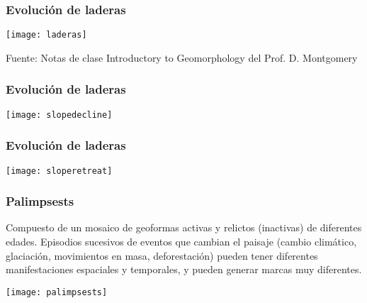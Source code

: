 \documentclass[]{beamer}
\begin{document}
\begin{frame}
\frametitle{Evolución de laderas}
\begin{center}
\texttt{[image: laderas]}
\end{center}
\tiny{Fuente: Notas de clase Introductory to Geomorphology del Prof. D. Montgomery}
\end{frame}
\begin{frame}
\frametitle{Evolución de laderas}
\begin{center}
\texttt{[image: slopedecline]}
\end{center}
\end{frame}
\begin{frame}
\frametitle{Evolución de laderas}
\begin{center}
\texttt{[image: sloperetreat]}
\end{center}
\end{frame}
\begin{frame}
\frametitle{Palimpsests}
\small{Compuesto de un mosaico de geoformas activas y relictos (inactivas) de diferentes edades. Episodios sucesivos de eventos que cambian el paisaje (cambio climático, glaciación, movimientos en masa, deforestación) pueden tener diferentes manifestaciones espaciales y temporales, y pueden generar marcas muy diferentes.}
\begin{center}
\texttt{[image: palimpsests]}
\end{center}
\end{frame}
\end{document}
